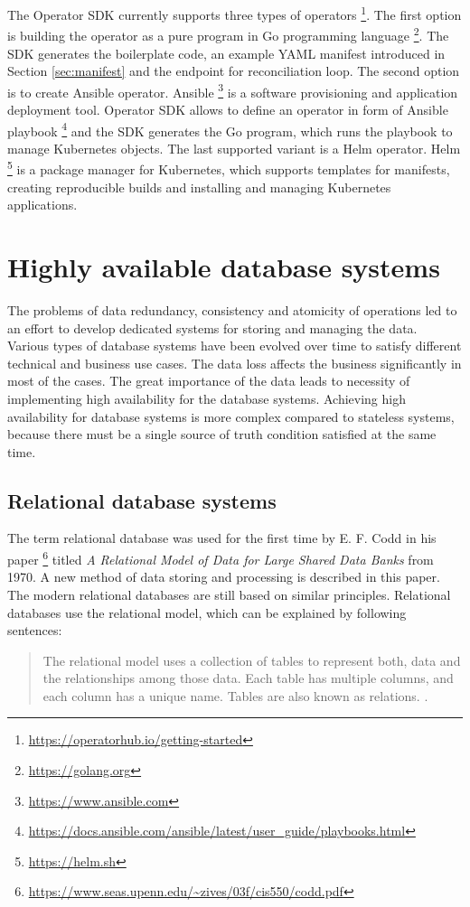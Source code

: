 \documentclass[
  digital, %
  twoside, %
  table,   %
  lof,     %
  lot,     %
]{fithesis3}
\begin{document}
The Operator SDK currently supports three types of operators \footnote{\url{https://operatorhub.io/getting-started}}. The first option is building the operator as a pure program in Go programming language \footnote{\url{https://golang.org}}. The SDK generates the boilerplate code, an example YAML manifest introduced in Section \ref{sec:manifest} and the endpoint for reconciliation loop. The second option is to create Ansible operator. Ansible \footnote{\url{https://www.ansible.com}} is a software provisioning and application deployment tool. Operator SDK allows to define an operator in form of Ansible playbook \footnote{\url{https://docs.ansible.com/ansible/latest/user_guide/playbooks.html}} and the SDK generates the Go program, which runs the playbook to manage Kubernetes objects. The last supported variant is a Helm operator. Helm \footnote{\url{https://helm.sh}} is a package manager for Kubernetes, which supports templates for manifests, creating reproducible builds and installing and managing Kubernetes applications.

\chapter{Highly available database systems} \label{chap:ha_database_systems}
The problems of data redundancy, consistency and atomicity of operations led to an effort to develop dedicated systems for storing and managing the data. Various types of database systems have been evolved over time to satisfy different technical and business use cases. The data loss affects the business significantly in most of the cases. The great importance of the data leads to necessity of implementing high availability for the database systems. Achieving high availability for database systems is more complex compared to stateless systems, because there must be a single source of truth condition satisfied at the same time.

\section{Relational database systems}
The term relational database was used for the first time by E. F. Codd in his paper \footnote{\url{https://www.seas.upenn.edu/~zives/03f/cis550/codd.pdf}} titled \textit{A Relational Model of Data for Large Shared Data Banks} from 1970. A new method of data storing and processing is described in this paper. The modern relational databases are still based on similar principles. Relational databases use the relational model, which can be explained by following sentences:
\begin{quote}
The relational model uses a collection of tables to represent both, data and the relationships among those data. Each table has multiple columns, and each column has a unique name. Tables are also known as relations. \cite[p. 9]{db}.
\end{quote}
\end{document}
